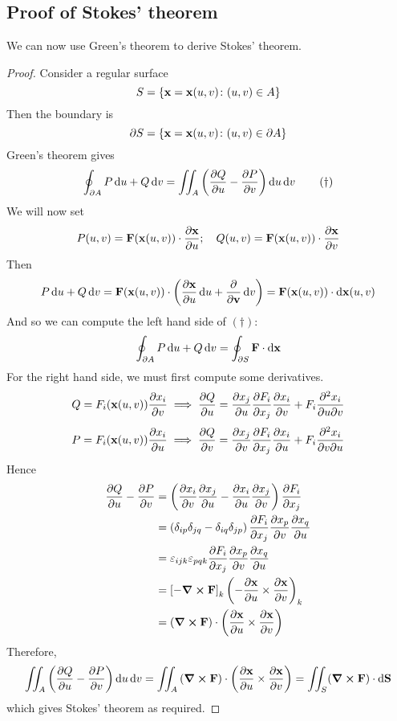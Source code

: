 \subsection{Proof of Stokes' theorem}
We can now use Green's theorem to derive Stokes' theorem.
\begin{proof}
	Consider a regular surface
	\[
		S = \left\{ \vb x = \vb x(u, v) \colon (u, v) \in A \right\}
	\]
	Then the boundary is
	\[
		\partial S = \left\{ \vb x = \vb x(u, v) \colon (u, v) \in \partial A \right\}
	\]
	Green's theorem gives
	\begin{equation}
		\oint_{\partial A} P \dd{u} + Q \dd{v} = \iint_A \left( \pdv{Q}{u} - \pdv{P}{v} \right) \dd{u}\dd{v}
		\tag{\(\dagger\)}
	\end{equation}
	We will now set
	\[
		P(u, v) = \vb F(\vb x(u, v)) \cdot \pdv{\vb x}{u};\quad Q(u, v) = \vb F(\vb x(u, v)) \cdot \pdv{\vb x}{v}
	\]
	Then
	\[
		P \dd{u} + Q \dd{v} = \vb F(\vb x(u, v)) \cdot \left( \pdv{\vb x}{u} \dd{u} + \pdv{\vb v} \dd{v} \right) = \vb F(\vb x(u, v)) \cdot \dd{\vb x(u, v)}
	\]
	And so we can compute the left hand side of \((\dagger)\):
	\[
		\oint_{\partial A} P \dd{u} + Q \dd{v} = \oint_{\partial S} \vb F \cdot \dd{\vb x}
	\]
	For the right hand side, we must first compute some derivatives.
	\[
		Q = F_i(\vb x(u, v))\pdv{x_i}{v} \implies \pdv{Q}{u} = \pdv{x_j}{u}\pdv{F_i}{x_j}\pdv{x_i}{v} + F_i \pdv{x_i}{u}{v}
	\]
	\[
		P = F_i(\vb x(u, v))\pdv{x_i}{u} \implies \pdv{Q}{v} = \pdv{x_j}{v}\pdv{F_i}{x_j}\pdv{x_i}{u} + F_i \pdv{x_i}{v}{u}
	\]
	Hence
	\begin{align*}
		\pdv{Q}{u} - \pdv{P}{v} & = \left( \pdv{x_i}{v}\pdv{x_j}{u} - \pdv{x_i}{u}\pdv{x_j}{v} \right) \pdv{F_i}{x_j}                       \\
		                        & = \left( \delta_{ip} \delta_{jq} - \delta_{iq} \delta_{jp} \right) \pdv{F_i}{x_j}\pdv{x_p}{v}\pdv{x_q}{u} \\
		                        & = \varepsilon_{ijk} \varepsilon_{pqk} \pdv{F_i}{x_j}\pdv{x_p}{v}\pdv{x_q}{u}                              \\
		                        & = \left[ -\curl{\vb F} \right]_k \left( -\pdv{\vb x}{u} \times \pdv{\vb x}{v} \right)_k                   \\
		                        & = \left( \curl{\vb F} \right) \cdot \left( \pdv{\vb x}{u} \times \pdv{\vb x}{v} \right)                   \\
	\end{align*}
	Therefore,
	\[
		\iint_{A} \left( \pdv{Q}{u} - \pdv{P}{v} \right) \dd{u}\dd{v} = \iint_{A} \left( \curl{\vb F} \right) \cdot \left( \pdv{\vb x}{u} \times \pdv{\vb x}{v} \right) = \iint_{S} (\curl{\vb F}) \cdot \dd{\vb S}
	\]
	which gives Stokes' theorem as required.
\end{proof}
